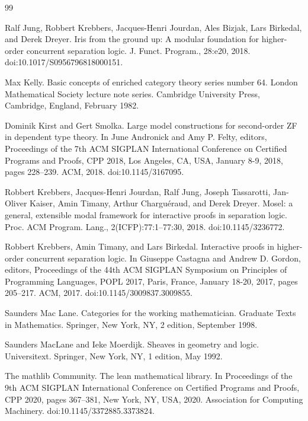 \begin{thebibliography}{99}
\par\noindent    Ralf Jung, Robbert Krebbers, Jacques-Henri Jourdan, Ales Bizjak, Lars Birkedal, and Derek Dreyer.  Iris from the ground up: A modular foundation for higher-order concurrent separation logic.  J. Funct. Program., 28:e20, 2018.  doi:10.1017/S0956796818000151.  

\par\noindent    Max Kelly.  Basic concepts of enriched category theory series number 64.  London Mathematical Society lecture note series. Cambridge University Press, Cambridge, England, February 1982.  

\par\noindent    Dominik Kirst and Gert Smolka.  Large model constructions for second-order ZF in dependent type theory.  In June Andronick and Amy P. Felty, editors, Proceedings of the 7th ACM SIGPLAN International Conference on Certified Programs and Proofs, CPP 2018, Los Angeles, CA, USA, January 8-9, 2018, pages 228–239. ACM, 2018.  doi:10.1145/3167095.  

\par\noindent    Robbert Krebbers, Jacques-Henri Jourdan, Ralf Jung, Joseph Tassarotti, Jan-Oliver Kaiser, Amin Timany, Arthur Charguéraud, and Derek Dreyer.  Mosel: a general, extensible modal framework for interactive proofs in separation logic.  Proc. ACM Program. Lang., 2(ICFP):77:1–77:30, 2018.  doi:10.1145/3236772.  

\par\noindent    Robbert Krebbers, Amin Timany, and Lars Birkedal.  Interactive proofs in higher-order concurrent separation logic.  In Giuseppe Castagna and Andrew D. Gordon, editors, Proceedings of the 44th ACM SIGPLAN Symposium on Principles of Programming Languages, POPL 2017, Paris, France, January 18-20, 2017, pages 205–217. ACM, 2017.  doi:10.1145/3009837.3009855.  

\par\noindent    Saunders Mac Lane.  Categories for the working mathematician.  Graduate Texts in Mathematics. Springer, New York, NY, 2 edition, September 1998.  

\par\noindent    Saunders MacLane and Ieke Moerdijk.  Sheaves in geometry and logic.  Universitext. Springer, New York, NY, 1 edition, May 1992.  

\par\noindent    The mathlib Community.  The lean mathematical library.  In Proceedings of the 9th ACM SIGPLAN International Conference on Certified Programs and Proofs, CPP 2020, pages 367–381, New York, NY, USA, 2020. Association for Computing Machinery.  doi:10.1145/3372885.3373824.  


\end{thebibliography}
